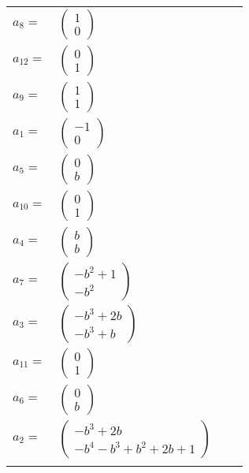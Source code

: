 \documentclass[1p]{elsarticle_modified}
\theoremstyle{definition}
\begin{document}
\begin{tabular}{m{7pt} m{180pt} m{7pt} m{180pt} }
\flushright $a_{8}=$&$\begin{pmatrix}1\\0\end{pmatrix}$ \\
\flushright $a_{12}=$&$\begin{pmatrix}0\\1\end{pmatrix}$ \\
\flushright $a_{9}=$&$\begin{pmatrix}1\\1\end{pmatrix}$ \\
\flushright $a_{1}=$&$\begin{pmatrix}-1\\0\end{pmatrix}$ \\
\flushright $a_{5}=$&$\begin{pmatrix}0\\b\end{pmatrix}$ \\
\flushright $a_{10}=$&$\begin{pmatrix}0\\1\end{pmatrix}$ \\
\flushright $a_{4}=$&$\begin{pmatrix}b\\b\end{pmatrix}$ \\
\flushright $a_{7}=$&$\begin{pmatrix}- b^2+1\\- b^2\end{pmatrix}$ \\
\flushright $a_{3}=$&$\begin{pmatrix}- b^3+2 b\\- b^3+b\end{pmatrix}$ \\
\flushright $a_{11}=$&$\begin{pmatrix}0\\1\end{pmatrix}$ \\
\flushright $a_{6}=$&$\begin{pmatrix}0\\b\end{pmatrix}$ \\
\flushright $a_{2}=$&$\begin{pmatrix}- b^3+2 b\\- b^4- b^3+b^2+2 b+1\end{pmatrix}$\\&\end{tabular}
\end{document}
